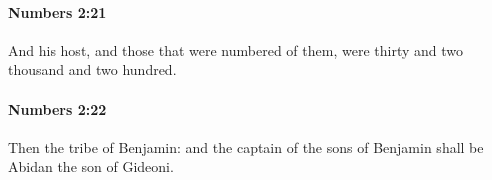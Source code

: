 		\paragraph{Numbers 2:21} %
			\label{NUMBERS-2-21}

			And his host, and those that were numbered of them, were thirty and two thousand and two hundred.


		\paragraph{Numbers 2:22} %
			\label{NUMBERS-2-22}

			Then the tribe of Benjamin: and the captain of the sons of Benjamin shall be Abidan the son of Gideoni.


